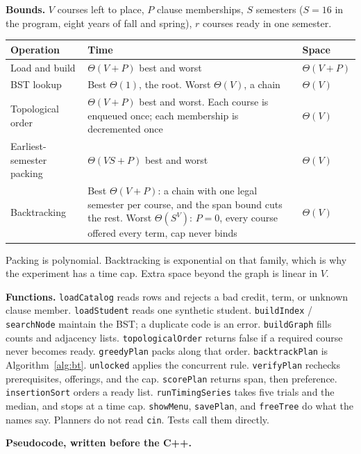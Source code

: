 \documentclass[10pt]{article}
\begin{document}
\textbf{Bounds.}
\label{sec:bounds}
\(V\) courses left to place, \(P\) clause memberships, \(S\) semesters
(\(S = 16\) in the program, eight years of fall and spring), \(r\) courses
ready in one semester.

{\footnotesize
\begin{tabularx}{\textwidth}{@{}>{\raggedright\arraybackslash}p{1.35in} Y Y@{}}
\toprule
\textbf{Operation} & \textbf{Time} & \textbf{Space} \\
\midrule
Load and build &
\(\Theta(V+P)\) best and worst &
\(\Theta(V+P)\) \\
BST lookup &
Best \(\Theta(1)\), the root. Worst \(\Theta(V)\), a chain &
\(\Theta(V)\) \\
Topological order &
\(\Theta(V+P)\) best and worst. Each course is enqueued once; each membership is decremented once &
\(\Theta(V)\) \\
Earliest-semester packing &
\(\Theta(VS+P)\) best and worst &
\(\Theta(V)\) \\
Backtracking &
Best \(\Theta(V+P)\): a chain with one legal semester per course, and the span bound cuts the rest.
Worst \(\Theta(S^{V})\): \(P = 0\), every course offered every term, cap never binds &
\(\Theta(V)\) \\
\bottomrule
\end{tabularx}}

Packing is polynomial. Backtracking is exponential on that family, which is why
the experiment has a time cap. Extra space beyond the graph is linear in \(V\).

\textbf{Functions.}
\texttt{loadCatalog} reads rows and rejects a bad credit, term, or unknown
clause member.
\texttt{loadStudent} reads one synthetic student.
\texttt{buildIndex} / \texttt{searchNode} maintain the BST; a duplicate code is
an error.
\texttt{buildGraph} fills counts and adjacency lists.
\texttt{topologicalOrder} returns false if a required course never becomes ready.
\texttt{greedyPlan} packs along that order.
\texttt{backtrackPlan} is Algorithm~\ref{alg:bt}.
\texttt{unlocked} applies the concurrent rule.
\texttt{verifyPlan} rechecks prerequisites, offerings, and the cap.
\texttt{scorePlan} returns span, then preference.
\texttt{insertionSort} orders a ready list.
\texttt{runTimingSeries} takes five trials and the median, and stops at a time cap.
\texttt{showMenu}, \texttt{savePlan}, and \texttt{freeTree} do what the names say.
Planners do not read \texttt{cin}. Tests call them directly.

\textbf{Pseudocode, written before the C++.}
\end{document}
